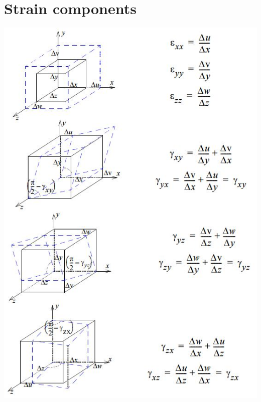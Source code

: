 \section{Strain components}
\includegraphics[width=0.7\linewidth]{figures/strain_components}
\label{fig:strain_components}

